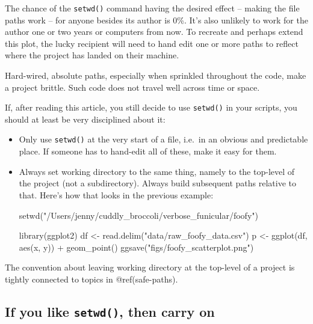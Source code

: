 \documentclass[
  letterpaper,
]{book}
\newenvironment{Shaded}{\begin{snugshade}}{\end{snugshade}}
\newcommand{\FunctionTok}[1]{\textcolor[rgb]{0.28,0.35,0.67}{#1}}
\newcommand{\NormalTok}[1]{\textcolor[rgb]{0.00,0.23,0.31}{#1}}
\newcommand{\OtherTok}[1]{\textcolor[rgb]{0.00,0.23,0.31}{#1}}
\newcommand{\SpecialCharTok}[1]{\textcolor[rgb]{0.37,0.37,0.37}{#1}}
\newcommand{\StringTok}[1]{\textcolor[rgb]{0.13,0.47,0.30}{#1}}
\begin{document}
The chance of the \texttt{setwd()} command having the desired effect --
making the file paths work -- for anyone besides its author is 0\%. It's
also unlikely to work for the author one or two years or computers from
now. To recreate and perhaps extend this plot, the lucky recipient will
need to hand edit one or more paths to reflect where the project has
landed on their machine.

Hard-wired, absolute paths, especially when sprinkled throughout the
code, make a project brittle. Such code does not travel well across time
or space.

If, after reading this article, you still decide to use \texttt{setwd()}
in your scripts, you should at least be very disciplined about it:

\begin{itemize}
\item
  Only use \texttt{setwd()} at the very start of a file, i.e.~in an
  obvious and predictable place. If someone has to hand-edit all of
  these, make it easy for them.
\item
  Always set working directory to the same thing, namely to the
  top-level of the project (not a subdirectory). Always build subsequent
  paths relative to that. Here's how that looks in the previous example:

\begin{Shaded}
\begin{Highlighting}[]
\FunctionTok{setwd}\NormalTok{(}\StringTok{"/Users/jenny/cuddly\_broccoli/verbose\_funicular/foofy"}\NormalTok{)}

\FunctionTok{library}\NormalTok{(ggplot2)}
\NormalTok{df }\OtherTok{\textless{}{-}} \FunctionTok{read.delim}\NormalTok{(}\StringTok{"data/raw\_foofy\_data.csv"}\NormalTok{)}
\NormalTok{p }\OtherTok{\textless{}{-}} \FunctionTok{ggplot}\NormalTok{(df, }\FunctionTok{aes}\NormalTok{(x, y)) }\SpecialCharTok{+} \FunctionTok{geom\_point}\NormalTok{()}
\FunctionTok{ggsave}\NormalTok{(}\StringTok{"figs/foofy\_scatterplot.png"}\NormalTok{)}
\end{Highlighting}
\end{Shaded}
\end{itemize}

The convention about leaving working directory at the top-level of a
project is tightly connected to topics in @ref(safe-paths).

\hypertarget{if-you-like-setwd-then-carry-on}{%
\subsection{\texorpdfstring{If you like \texttt{setwd()}, then carry
on}{If you like setwd(), then carry on}}\label{if-you-like-setwd-then-carry-on}}
\end{document}
